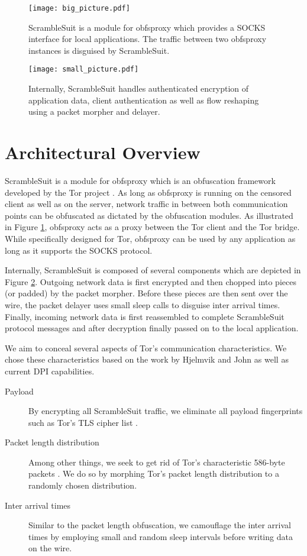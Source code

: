 \documentclass{sig-alternate}
\newcommand{\pt}{\textsf{ScrambleSuit}}
\numberwithin{enumi}{section}
\numberwithin{notesctr}{section}
\begin{document}
\begin{figure}[t]
\centering
\texttt{[image: big\_picture.pdf]}
\caption{\pt{} is a module for obfsproxy which provides a SOCKS interface for local applications.
The traffic between two obfsproxy instances is disguised by \pt{}.}
\label{fig:big_picture}
\end{figure}

\begin{figure}[t]
\centering
\texttt{[image: small\_picture.pdf]}
\caption{Internally, \pt{} handles authenticated encryption of application data, client
authentication as well as flow reshaping using a packet morpher and delayer.}
\label{fig:small_picture}
\end{figure}

\section{Architectural Overview}
\label{sec:architectural_overview}
\pt{} is a module for obfsproxy which is an obfuscation framework developed by the Tor
project \cite{obfsproxy}. As long as obfsproxy is running on the censored client as well as on the
server, network traffic in between both communication points can be obfuscated as dictated by the
obfuscation modules. As illustrated in Figure \ref{fig:big_picture}, obfsproxy acts as a proxy
between the Tor client and the Tor bridge. While specifically designed for Tor, obfsproxy can be
used by any application as long as it supports the SOCKS protocol.


Internally, \pt{} is composed of several components which are depicted in Figure
\ref{fig:small_picture}. Outgoing network data is first encrypted and then chopped into pieces (or
padded) by the packet morpher. Before these pieces are then sent over the wire, the packet delayer
uses small sleep calls to disguise inter arrival times. Finally, incoming network data is first
reassembled to complete \pt{} protocol messages and after decryption finally passed on to the local
application.

We aim to conceal several aspects of Tor's communication characteristics. We chose these
characteristics based on the work by Hjelmvik and John \cite{Hjelmvik2010,Hjelmvik2009} as well as
current DPI capabilities.
\begin{description}
	\item[Payload] By encrypting all \pt{} traffic, we eliminate all payload fingerprints such
		as Tor's TLS cipher list \cite{Winter2012}.
	\item[Packet length distribution] Among other things, we seek to get rid of Tor's characteristic
		586-byte packets \cite{Weinberg2012,Kadianakis2012}. We do so by morphing Tor's packet
		length distribution to a randomly chosen distribution.
	\item[Inter arrival times] Similar to the packet length obfuscation, we camouflage the inter
		arrival times by employing small and random sleep intervals before writing data on the wire.
\end{description}
\end{document}
